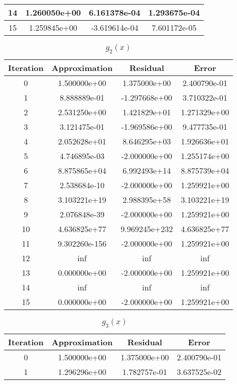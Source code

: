 \documentclass{article}
\begin{document}
\begin{enumerate}[label=\alph*.)]
\begin{table}[h]
\begin{tabular}{|c|c|c|c|}
\hline
14 & 1.260050e+00 & 6.161378e-04 & 1.293675e-04 \\
\hline
15 & 1.259845e+00 & -3.619614e-04 & 7.601172e-05 \\
\hline
\end{tabular}
\end{table}
\begin{table}[h]
\centering
\caption{$g_2(x)$}
\begin{tabular}{|c|c|c|c|}
\hline
Iteration & Approximation & Residual & Error \\
\hline
0 & 1.500000e+00 & 1.375000e+00 & 2.400790e-01 \\
\hline
1 & 8.888889e-01 & -1.297668e+00 & 3.710322e-01 \\
\hline
2 & 2.531250e+00 & 1.421829e+01 & 1.271329e+00 \\
\hline
3 & 3.121475e-01 & -1.969586e+00 & 9.477735e-01 \\
\hline
4 & 2.052628e+01 & 8.646295e+03 & 1.926636e+01 \\
\hline
5 & 4.746895e-03 & -2.000000e+00 & 1.255174e+00 \\
\hline
6 & 8.875865e+04 & 6.992493e+14 & 8.875739e+04 \\
\hline
7 & 2.538684e-10 & -2.000000e+00 & 1.259921e+00 \\
\hline
8 & 3.103221e+19 & 2.988395e+58 & 3.103221e+19 \\
\hline
9 & 2.076848e-39 & -2.000000e+00 & 1.259921e+00 \\
\hline
10 & 4.636825e+77 & 9.969245e+232 & 4.636825e+77 \\
\hline
11 & 9.302260e-156 & -2.000000e+00 & 1.259921e+00 \\
\hline
12 & inf & inf & inf \\
\hline
13 & 0.000000e+00 & -2.000000e+00 & 1.259921e+00 \\
\hline
14 & inf & inf & inf \\
\hline
15 & 0.000000e+00 & -2.000000e+00 & 1.259921e+00 \\
\hline
\end{tabular}
\end{table}
\begin{table}[h]
\centering
\caption{$g_3(x)$}
\begin{tabular}{|c|c|c|c|}
\hline
Iteration & Approximation & Residual & Error \\
\hline
0 & 1.500000e+00 & 1.375000e+00 & 2.400790e-01 \\
\hline
1 & 1.296296e+00 & 1.782757e-01 & 3.637525e-02 \\

\end{tabular}
\end{table}
\end{enumerate}
\end{document}
